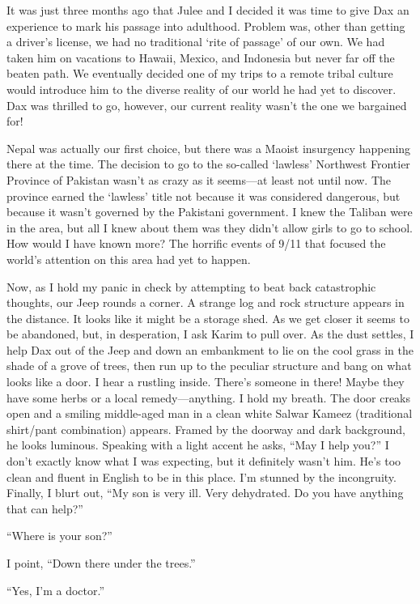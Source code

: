 \documentclass[12pt, titlepage]{article}
\begin{document}
{\begin{spacing}{1.15}
It was just three months ago that Julee and I decided it was time to give Dax an experience to mark his passage into adulthood.  Problem was, other than getting a driver's license, we had no traditional `rite of passage' of our own.  We had taken him on vacations to Hawaii, Mexico, and Indonesia but never far off the beaten path. We eventually decided one of my trips to a remote tribal culture would introduce him to the diverse reality of our world he had yet to discover. Dax was thrilled to go, however, our current reality wasn't the one we bargained for!  

 Nepal was actually our first choice, but there was a Maoist insurgency happening there at the time.  The decision to go to the so-called `lawless' Northwest Frontier Province of Pakistan wasn't as crazy as it seems—at least not until now. The province earned the `lawless' title not because it was considered dangerous, but because it wasn't governed by the Pakistani government. I knew the Taliban were in the area, but all I knew about them was they didn't allow girls to go to school.  How would I have known more? The horrific events of 9/11 that focused the world's attention on this area had yet to happen. 

Now, as I hold my panic in check by attempting to beat back catastrophic thoughts, our Jeep rounds a corner.  A strange log and rock structure appears in the distance. It looks like it might be a storage shed.  As we get closer it seems to be abandoned, but, in desperation, I ask Karim to pull over.  As the dust settles, I help Dax out of the Jeep and down an embankment to lie on the cool grass in the shade of a grove of trees, then run up to the peculiar structure and bang on what looks like a door.  I hear a rustling inside. There's someone in there!  Maybe they have some herbs or a local remedy—anything.  I hold my breath. The door creaks open and a smiling middle-aged man in a clean white Salwar Kameez (traditional shirt/pant combination) appears. Framed by the doorway and dark background, he looks luminous.  Speaking with a light accent he asks, ``May I help you?'' I don't exactly know what I was expecting, but it definitely wasn't him.  He's too clean and fluent in English to be in this place.   I'm stunned by the incongruity. Finally, I blurt out, ``My son is very ill. Very dehydrated.  Do you have anything that can help?''

``Where is your son?''

I point, ``Down there under the trees.''

``Yes, I'm a doctor.''


\end{spacing}}
\end{document}
